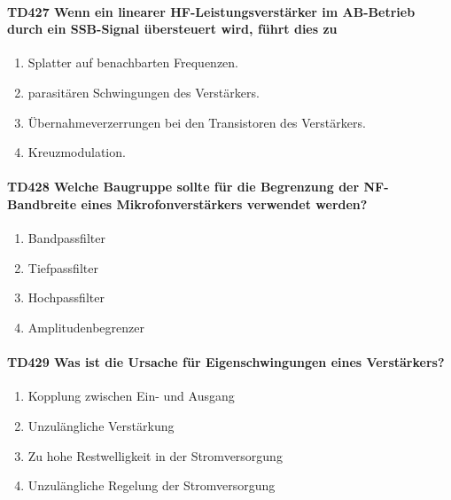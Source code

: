 \documentclass[8pt]{article}
\begin{document}
\begin{enumerate}
\begin{enumerate}[nolistsep,label=\Alph*]
\paragraph*{TD427 Wenn ein linearer HF-Leistungsverstärker im AB-Betrieb durch ein SSB-Signal übersteuert wird, führt dies zu} 
\begin{enumerate}[nolistsep,label=\Alph*]
\item Splatter auf benachbarten Frequenzen.
\item parasitären Schwingungen des Verstärkers.
\item Übernahmeverzerrungen bei den Transistoren des Verstärkers.
\item Kreuzmodulation.
\end{enumerate}

\paragraph*{TD428 Welche Baugruppe sollte für die Begrenzung der NF-Bandbreite eines Mikrofonverstärkers verwendet werden?}
\begin{enumerate}[nolistsep,label=\Alph*]
\item Bandpassfilter
\item Tiefpassfilter
\item Hochpassfilter
\item Amplitudenbegrenzer
\end{enumerate}

\paragraph*{TD429 Was ist die Ursache für Eigenschwingungen eines Verstärkers?}
\begin{enumerate}[nolistsep,label=\Alph*]
\item Kopplung zwischen Ein- und Ausgang
\item Unzulängliche Verstärkung
\item Zu hohe Restwelligkeit in der Stromversorgung
\item Unzulängliche Regelung der Stromversorgung
\end{enumerate}


\end{enumerate}
\end{enumerate}
\end{document}
